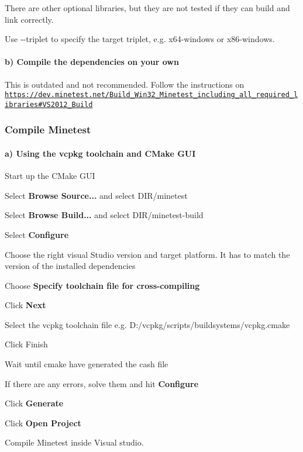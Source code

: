There are other optional libraries, but they are not tested if they can build and link correctly.

Use {\ttfamily -\/-\/triplet} to specify the target triplet, e.\+g. {\ttfamily x64-\/windows} or {\ttfamily x86-\/windows}.

\paragraph*{b) Compile the dependencies on your own}

This is outdated and not recommended. Follow the instructions on \href{https://dev.minetest.net/Build_Win32_Minetest_including_all_required_libraries#VS2012_Build}{\tt https\+://dev.\+minetest.\+net/\+Build\+\_\+\+Win32\+\_\+\+Minetest\+\_\+including\+\_\+all\+\_\+required\+\_\+libraries\#\+V\+S2012\+\_\+\+Build}

\subsubsection*{Compile Minetest}

\paragraph*{a) Using the vcpkg toolchain and C\+Make G\+UI}


\begin{DoxyEnumerate}
\item Start up the C\+Make G\+UI
\item Select {\bfseries Browse Source...} and select D\+I\+R/minetest
\item Select {\bfseries Browse Build...} and select D\+I\+R/minetest-\/build
\item Select {\bfseries Configure}
\item Choose the right visual Studio version and target platform. It has to match the version of the installed dependencies
\item Choose {\bfseries Specify toolchain file for cross-\/compiling}
\item Click {\bfseries Next}
\item Select the vcpkg toolchain file e.\+g. {\ttfamily D\+:/vcpkg/scripts/buildsystems/vcpkg.cmake}
\item Click Finish
\item Wait until cmake have generated the cash file
\item If there are any errors, solve them and hit {\bfseries Configure}
\item Click {\bfseries Generate}
\item Click {\bfseries Open Project}
\item Compile Minetest inside Visual studio.
\end{DoxyEnumerate}

